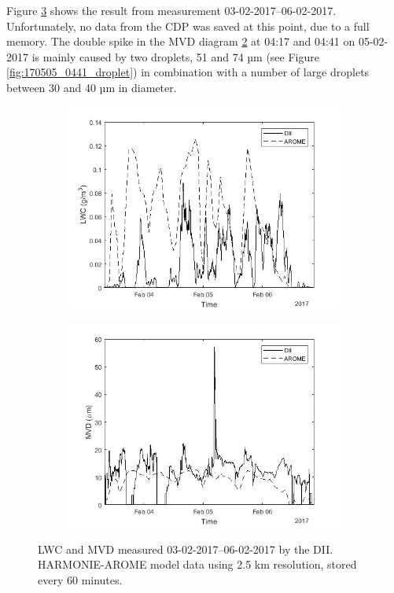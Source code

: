 \clearpage
Figure \ref{fig:0203-0206_lwc_mvd} shows the result from measurement 03-02-2017--06-02-2017. Unfortunately, no data from the CDP was saved at this point, due to a full memory. The double spike in the MVD diagram \ref{fig:0203-0206_MVDvstime} at 04:17 and 04:41 on 05-02-2017 is mainly caused by two droplets, 51 and 74 µm (see Figure \ref{fig:170505_0441_droplet}) in combination with a number of large droplets between 30 and 40 µm in diameter.

\begin{figure}[ht]
\centering
\begin{subfigure}[t]{.85\textwidth}
  \centering
  \includegraphics[width=1\linewidth]{figures/0203-0206/30min_lwc_foggy_smhi_170203-170206_86h}
  \label{fig:0203-0206_LWCvstime}
\end{subfigure}%

\begin{subfigure}[t]{.85\textwidth}
  \centering
  \includegraphics[width=1\linewidth]{figures/0203-0206/30min_mvd_foggy_smhi_170203-170206_86h}
  \label{fig:0203-0206_MVDvstime}
\end{subfigure}
\caption{LWC and MVD measured 03-02-2017--06-02-2017 by the DII. HARMONIE-AROME model data using 2.5 km resolution, stored every 60 minutes.}
\label{fig:0203-0206_lwc_mvd}
\end{figure}

